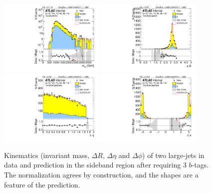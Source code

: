 \begin{figure}[htbp!]
\begin{center}
\includegraphics[width=0.45\textwidth,angle=-90]{figures/boosted/Sideband/b77_ThreeTag_Sideband_mHH_l_1.pdf}
\includegraphics[width=0.45\textwidth,angle=-90]{figures/boosted/Sideband/b77_ThreeTag_Sideband_hCandDr.pdf}\\
\includegraphics[width=0.45\textwidth,angle=-90]{figures/boosted/Sideband/b77_ThreeTag_Sideband_hCandDeta.pdf}
\includegraphics[width=0.45\textwidth,angle=-90]{figures/boosted/Sideband/b77_ThreeTag_Sideband_hCandDphi.pdf}
  \caption{Kinematics (invariant mass, $\Delta R$, $\Delta \eta$ and $\Delta \phi$) of two large-\R jets in data and prediction in the sideband region after requiring 3 $b$-tags. The normalization agrees by construction, and the shapes are a feature of the prediction. }
  \label{fig:boosted-3b-sideband-ak10-system}
\end{center}
\end{figure}

